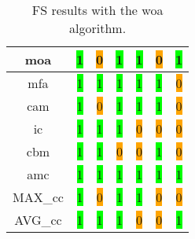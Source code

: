 \begin{table}[H]
\begin{tabular}{|c|c|c|c|c|c|c|}
        \acrshort{moa} & \colorbox{lime}{1} & \colorbox{orange}{0} & \colorbox{lime}{1} & \colorbox{lime}{1} & \colorbox{orange}{0} & \colorbox{lime}{1} \\ \hline
        \acrshort{mfa} & \colorbox{lime}{1} & \colorbox{lime}{1} & \colorbox{lime}{1} & \colorbox{lime}{1} & \colorbox{lime}{1} & \colorbox{orange}{0} \\ \hline
        \acrshort{cam} & \colorbox{lime}{1} & \colorbox{orange}{0} & \colorbox{lime}{1} & \colorbox{lime}{1} & \colorbox{lime}{1} & \colorbox{orange}{0} \\ \hline
        \acrshort{ic} & \colorbox{lime}{1} & \colorbox{lime}{1} & \colorbox{lime}{1} & \colorbox{orange}{0} & \colorbox{orange}{0} & \colorbox{orange}{0} \\ \hline
        \acrshort{cbm} & \colorbox{lime}{1} & \colorbox{lime}{1} & \colorbox{orange}{0} & \colorbox{orange}{0} & \colorbox{lime}{1} & \colorbox{orange}{0} \\ \hline
        \acrshort{amc} & \colorbox{lime}{1} & \colorbox{lime}{1} & \colorbox{lime}{1} & \colorbox{lime}{1} & \colorbox{lime}{1} & \colorbox{lime}{1} \\ \hline
        MAX\_\acrshort{cc} & \colorbox{lime}{1} & \colorbox{orange}{0} & \colorbox{lime}{1} & \colorbox{lime}{1} & \colorbox{orange}{0} & \colorbox{orange}{0} \\ \hline
        AVG\_\acrshort{cc} & \colorbox{lime}{1} & \colorbox{lime}{1} & \colorbox{lime}{1} & \colorbox{orange}{0} & \colorbox{orange}{0} & \colorbox{lime}{1} \\ \hline
    \end{tabular}
\caption{FS results with the \acrlong{woa} algorithm.}
\label{tab:woa-output}
\end{table}

